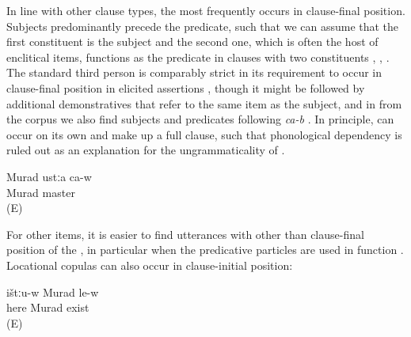 In line with other clause types, the  most frequently occurs in clause-final position. Subjects predominantly precede the predicate, such that we can assume that the first  constituent is the  subject and the second one, which is often the host of enclitical  items, functions as the predicate in clauses with two  constituents , , . The standard third person   is comparably strict in its requirement to occur in clause-final position in elicited assertions , though it might be followed by additional demonstratives that refer to the same item as the subject, and in  from the corpus we also find  subjects and predicates following \textit{ca-b} . In principle,  can occur on its own and make up a full clause, such that phonological dependency is ruled out as an explanation for the ungrammaticality of . 


\begin{exe}
	\ex	\label{ex:Murad is a / the master}
	\begin{xlist}
		\ex	\label{ex:Murad is a / the master@A}
		\gll	Murad	ustːa ca-w\\
			Murad master \\
		\glt	{} (E)
	
		 \label{ex:Murad is a / the master@B}
		 \label{ex:Murad is a / the master@C}
	\end{xlist}
\end{exe}

For other  items, it is easier to find utterances with other than clause-final position of the , in particular when the predicative particles are used in  function . Locational copulas can also occur in clause-initial position:
%
\begin{exe}
	\ex	\label{ex:Murad is here}
	\begin{xlist}
		\ex	\label{ex:Murad is here@A}
		\gll	ištːu-w	Murad	le-w\\
			here	Murad	exist\tsc{-m}\\
		\glt	\sqt{Murad is here.} (E)
	
		\ex	{}	\label{ex:Murad is here@B}
	\end{xlist}
\end{exe}

